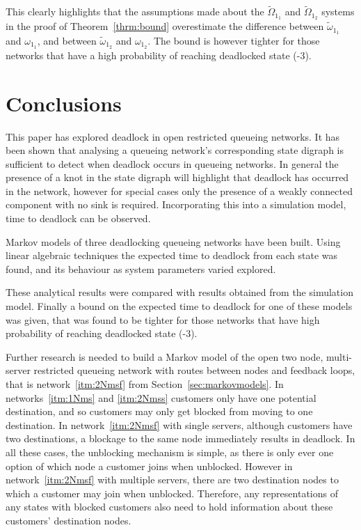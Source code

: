 \documentclass{article}
\numberwithin{equation}{section}
\begin{document}
This clearly highlights that the assumptions made about the
$\widetilde{\Omega}_{1_1}$ and $\widetilde{\Omega}_{1_2}$ systems in the proof
of Theorem~\ref{thrm:bound} overestimate the difference between
$\widetilde{\omega}_{1_1}$ and $\omega_{1_1}$, and between
$\widetilde{\omega}_{1_2}$ and $\omega_{1_2}$.
The bound is however tighter for those networks that have a high probability
of reaching deadlocked state (-3).


\section{Conclusions}\label{sec:conclusions}

This paper has explored deadlock in open restricted queueing networks.
It has been shown that analysing a queueing network's corresponding state
digraph is sufficient to detect when deadlock occurs in queueing networks.
In general the presence of a knot in the state digraph will highlight that
deadlock has occurred in the network, however for special cases only the
presence of a weakly connected component with no sink is required.
Incorporating this into a simulation model, time to deadlock can be observed.

Markov models of three deadlocking queueing networks have been built.
Using linear algebraic techniques the expected time to deadlock from each
state was found, and its behaviour as system parameters varied explored.

These analytical results were compared with results obtained from the
simulation model.
Finally a bound on the expected time to deadlock for one of these models was
given, that was found to be tighter for those networks that have high
probability of reaching deadlocked state (-3).

Further research is needed to build a Markov model of the open two node,
multi-server restricted queueing network with routes between nodes and
feedback loops, that is network~\ref{itm:2Nmsf} from Section~\ref{sec:markovmodels}.
In networks~\ref{itm:1Nms} and \ref{itm:2Nmss} customers only have one
potential destination, and so customers may only get blocked from moving to
one destination.
In network~\ref{itm:2Nmsf} with single servers, although customers have two
destinations, a blockage to the same node immediately results in deadlock.
In all these cases, the unblocking mechanism is simple, as there is only ever
one option of which node a customer joins when unblocked.
However in network~\ref{itm:2Nmsf} with multiple servers, there are two
destination nodes to which a customer may join when unblocked.
Therefore, any representations of any states with blocked customers also need
to hold information about these customers' destination nodes.
\end{document}
